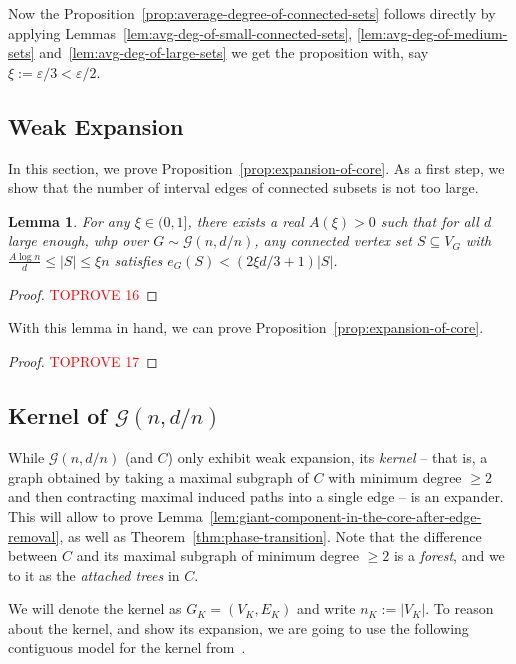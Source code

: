 \documentclass[11pt]{article}
\theoremstyle{plain}
\newtheorem{lemma}[theorem]{Lemma}
\let\epsilon=\varepsilon
\newcommand{\G}{\mathcal{G}}
\newcommand{\1}{\mathbb{1}}
\begin{document}
Now the Proposition~\ref{prop:average-degree-of-connected-sets} follows directly by applying Lemmas~\ref{lem:avg-deg-of-small-connected-sets}, \ref{lem:avg-deg-of-medium-sets} and~\ref{lem:avg-deg-of-large-sets} we get the proposition with, say \(\xi := \epsilon / 3 < \epsilon/2\).

\subsection{Weak Expansion}
\label{proof:propexpansion}

In this section, we prove Proposition~\ref{prop:expansion-of-core}. As a first step, we show that the number of interval edges of connected subsets is not too large.

\begin{lemma}\label{lem:not-too-many-internal-edges}
    For any \(\xi\in(0, 1]\), there exists a real \(A(\xi) > 0\) such that for all \(d\) large enough, whp over \(G\sim\G(n,d/n)\), any connected vertex set \(S\subseteq V_G\) with  \(\frac{A\log n}{d}\leq |S|\leq \xi n\) satisfies \(e_G(S) < (2\xi d/3 + 1)|S|\).
\end{lemma}
\begin{proof}\textcolor{red}{TOPROVE 16}\end{proof}

With this lemma in hand, we can prove Proposition~\ref{prop:expansion-of-core}.

\weakexpansion*
\begin{proof}\textcolor{red}{TOPROVE 17}\end{proof}


\subsection{Kernel of \(\G(n,d/n)\)}

While \(\G(n,d/n)\) (and \(C\)) only exhibit weak expansion, its \textit{kernel} -- that is, a graph obtained by taking a maximal subgraph of \(C\) with minimum degree \(\geq 2\) and then contracting maximal induced paths into a single edge -- is an expander. This will allow to prove Lemma~\ref{lem:giant-component-in-the-core-after-edge-removal}, as well as Theorem~\ref{thm:phase-transition}. Note that the difference between \(C\) and its maximal subgraph of minimum degree \(\geq 2\) is a \textit{forest}, and we to it as the \textit{attached trees} in \(C\).

We will denote the kernel as \(G_K = (V_K,E_K)\) and write \(n_K := |V_K|\). To reason about the kernel, and show its expansion, we are going to use the following contiguous model for the kernel from~\cite{anatomy-of-giant}.
\end{document}
